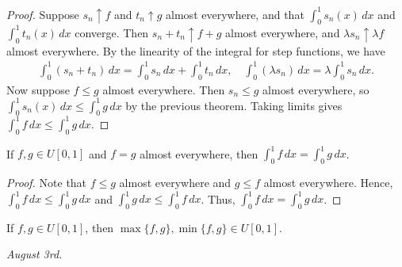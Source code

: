 \begin{proof}
    Suppose $s_{n} \uparrow f$ and $t_{n} \uparrow g$ almost everywhere, and that $\int_{0}^{1} s_{n}(x) \, dx$ and $\int_{0}^{1} t_{n}(x) \, dx$ converge. Then $s_{n}+t_{n} \uparrow f+g$ almost everywhere, and $\lambda s_{n} \uparrow \lambda f$ almost everywhere. By the linearity of the integral for step functions, we have
    \begin{align}
        \int_{0}^{1} (s_{n}+t_{n})\, dx = \int_{0}^{1} s_{n} \, dx + \int_{0}^{1} t_{n}\, dx, \quad \int_{0}^{1} (\lambda s_{n}) \, dx = \lambda \int_{0}^{1} s_{n} \, dx.
    \end{align}
    Now suppose $f \leq g$ almost everywhere. Then $s_{n} \leq g$ almost everywhere, so $\int_{0}^{1} s_{n}(x) \, dx \leq \int_{0}^{1} g \, dx$ by the previous theorem. Taking limits gives $\int_{0}^{1} f \, dx \leq \int_{0}^{1} g \, dx$.
\end{proof}

\begin{theorem}
    If $f,g \in U[0,1]$ and $f=g$ almost everywhere, then $\int_{0}^{1} f \, dx = \int_{0}^{1} g \, dx$.
\end{theorem}
\begin{proof}
    Note that $f \leq g$ almost everywhere and $g \leq f$ almost everywhere. Hence, $\int_{0}^{1} f \, dx \leq \int_{0}^{1} g \, dx$ and $\int_{0}^{1} g \, dx \leq \int_{0}^{1} f \, dx$. Thus, $\int_{0}^{1} f \, dx = \int_{0}^{1} g \, dx$.
\end{proof}

\begin{theorem}
    If $f,g \in U[0,1]$, then $\max\{f,g\},\min\{f,g\} \in U[0,1]$.
\end{theorem}



\textit{August 3rd.}

